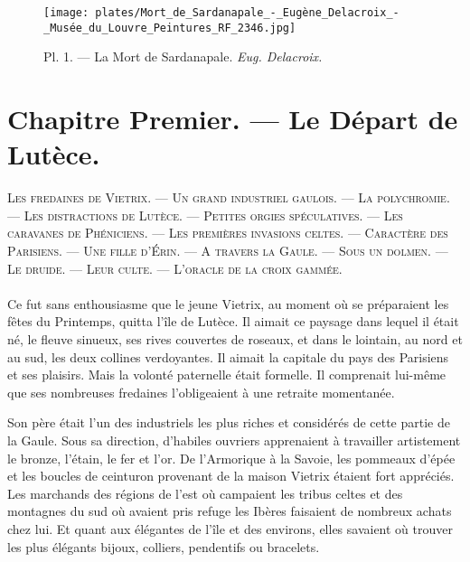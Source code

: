 \documentclass[a4paper, 11pt, oneside, polutonikogreek, french]{article}
\begin{document}
\setlength{\parskip}{1mm plus1mm minus1mm}
\clearpage
\tableofcontents
\clearpage
\begin{landscape}
\begin{figure}[H]
\centering
\texttt{[image: plates/Mort\_de\_Sardanapale\_-\_Eugène\_Delacroix\_-\_Musée\_du\_Louvre\_Peintures\_RF\_2346.jpg]}
\caption{Pl. 1. --- La Mort de Sardanapale. \emph{Eug. Delacroix.}}
\end{figure}
\end{landscape}
\clearpage
\section{Chapitre Premier. --- Le Départ de Lutèce.}
\begin{center}
\scshape
\small
Les fredaines de Vietrix. --- Un grand industriel gaulois. --- La polychromie. --- Les distractions de Lutèce. --- Petites orgies spéculatives. --- Les caravanes de Phéniciens. --- Les premières invasions celtes. --- Caractère des Parisiens. --- Une fille d'Érin. --- A travers la Gaule. --- Sous un dolmen. --- Le druide. --- Leur culte. --- L'oracle de la croix gammée.
\end{center}
\paragraph{}
Ce fut sans enthousiasme que le jeune Vietrix, au moment où se préparaient les fêtes du Printemps, quitta l'île de Lutèce. Il aimait ce paysage dans lequel il était né, le fleuve sinueux, ses rives couvertes de roseaux, et dans le lointain, au nord et au sud, les deux collines verdoyantes. Il aimait la capitale du pays des Parisiens et ses plaisirs. Mais la volonté paternelle était formelle. Il comprenait lui-même que ses nombreuses fredaines l'obligeaient à une retraite momentanée.

Son père était l'un des industriels les plus riches et considérés de cette partie de la Gaule. Sous sa direction, d'habiles ouvriers apprenaient à travailler artistement le bronze, l'étain, le fer et l'or. De l'Armorique à la Savoie, les pommeaux d'épée et les boucles de ceinturon provenant de la maison Vietrix étaient fort appréciés. Les marchands des régions de l'est où campaient les tribus celtes et des montagnes du sud où avaient pris refuge les Ibères faisaient de nombreux achats chez lui. Et quant aux élégantes de l'île et des environs, elles savaient où trouver les plus élégants bijoux, colliers, pendentifs ou bracelets.
\end{document}
